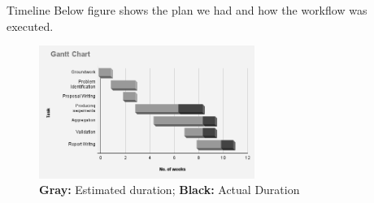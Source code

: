 
\begin{frame}{Timeline}
Below figure shows the plan we had and how the workflow was executed.
\begin{figure}[ht]
\includegraphics[width = 7cm]{GanttChart.png}
\caption{\textbf{Gray:} Estimated duration; \textbf{Black:} Actual Duration}
\end{figure}
\end{frame}

